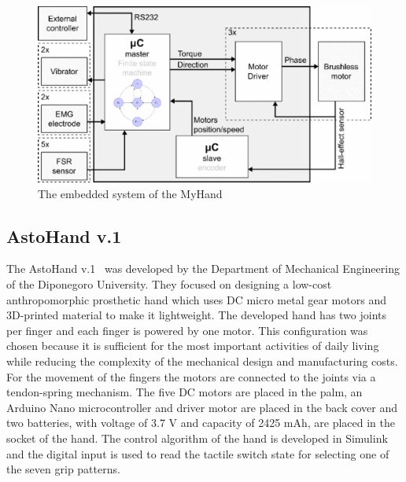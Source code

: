 \documentclass[a4paper, 10pt, conference]{ieeeconf}      %
\begin{document}
\begin{figure}[h]

	\centering
	\includegraphics[scale=0.3]{images/MyHand2}
	
	\caption{The embedded system of the MyHand}
	\label{fig:embmyhand}
\end{figure}


\subsection{AstoHand v.1}

The AstoHand v.1~\cite{astohand} was developed by the Department of Mechanical Engineering of the Diponegoro University. They focused on designing a low-cost anthropomorphic prosthetic hand which uses DC micro metal gear motors and 3D-printed material to make it lightweight. The developed hand has two joints per finger and each finger is powered by one motor. This configuration was chosen because it is sufficient for the most important activities of daily living while reducing the complexity of the mechanical design and manufacturing costs. For the movement of the fingers the motors are connected to the joints via a tendon-spring mechanism. The five DC motors are placed in the palm, an Arduino Nano microcontroller and driver motor are placed in the back cover and two batteries, with voltage of 3.7 V and capacity of 2425 mAh, are placed in the socket of the hand. The control algorithm of the hand is developed in Simulink and the digital input is used to read the tactile switch state for selecting one of the seven grip patterns.
\end{document}
